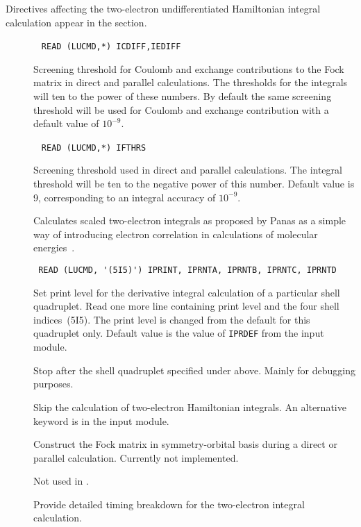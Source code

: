 Directives affecting the two-electron
undifferentiated Hamiltonian
integral calculation appear in the  section.
\begin{description}
\item[]\verb| |\newline
\verb|READ (LUCMD,*) ICDIFF,IEDIFF|

Screening threshold for Coulomb and exchange
contributions to the Fock
matrix in direct and parallel calculations. The thresholds for the
integrals will ten to the power of these numbers. By default the same
screening threshold will be used for Coulomb and exchange
contribution with a default value of $10^{-9}$.

\item[]\verb| |\newline
\verb|READ (LUCMD,*) IFTHRS|

Screening threshold used in direct and
parallel calculations. The integral threshold will be ten to the
negative power of this number. Default value is 9, corresponding
to an integral accuracy of $10^{-9}$.

\item[] Calculates scaled two-electron integrals as
proposed by Panas as a simple way of introducing electron
correlation in calculations of molecular energies~\cite{ipcpl245}.

\item[]\verb| |\newline
\verb|READ (LUCMD, '(5I5)') IPRINT, IPRNTA, IPRNTB, IPRNTC, IPRNTD|

Set print level for the derivative integral calculation of a particular shell
quadruplet.  Read one more line containing print level and the four
shell indices~(5I5).  The print level is changed from the default
for this quadruplet only. Default value is the value of \verb|IPRDEF|
from the  input module.

\item[] Stop after the shell quadruplet specified
under  above. Mainly for debugging purposes.

\item[] Skip the calculation of two-electron Hamiltonian
integrals. An alternative keyword is  in the 
input module.

\item[] Construct the Fock matrix in symmetry-orbital
basis during a direct or parallel calculation. Currently not implemented.

\item[] Not used in \siraba .

\item[] Provide detailed timing breakdown for the
two-electron integral calculation.
\end{description}
